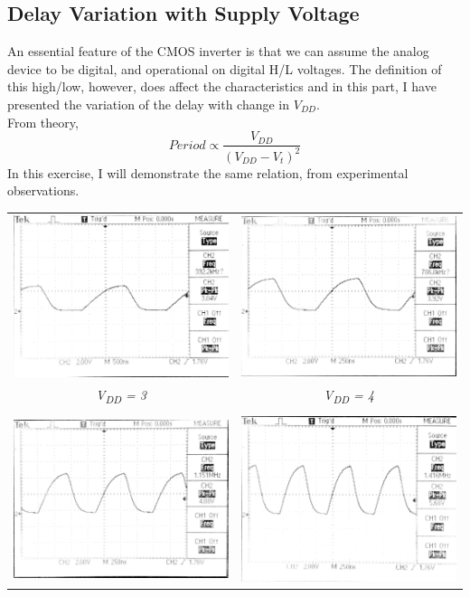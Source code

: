 \documentclass[a4paper, 11pt]{article}
\begin{document}
\subsection{Delay Variation with Supply Voltage}
An essential feature of the CMOS inverter is that we can assume the analog device to be digital, and operational on digital H/L voltages. The definition of this high/low, however, does affect the characteristics and in this part, I have presented the variation of the delay with change in $V_{DD}$. \\
From theory,
$$
Period \propto \frac{V_{DD}}{(V_{DD} - V_t)^2}
$$ In this exercise, I will demonstrate the same relation, from experimental observations.

\begin{table}[H]
\centering 
  \begin{tabular}{ c  c }
      \includegraphics[width=2.5in]{EE214_7.jpg} & \includegraphics[width=2.5in]{EE214_5.jpg} \\
      \em V\textsubscript{DD} = 3 & \em V\textsubscript{DD} = 4 \\
         & \\
      \includegraphics[width=2.5in]{EE214_1.jpg} & \includegraphics[width=2.5in]{EE214_6.jpg} \\

\end{tabular}
\end{table}
\end{document}
